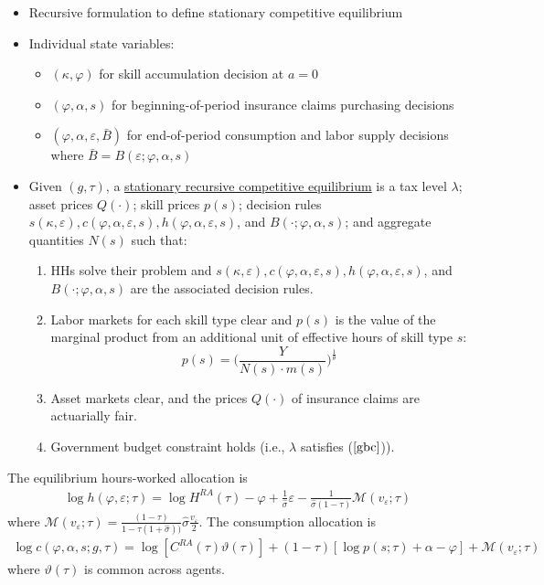 \documentclass{article}
\newcommand{\M}{\mathcal{M}}
\begin{document}
\begin{itemize}
\item Recursive formulation to define stationary competitive equilibrium
\item Individual state variables:
\begin{itemize}
\item $(\kappa, \varphi)$ for skill accumulation decision at $a = 0$
\item $(\varphi, \alpha, s)$ for beginning-of-period insurance claims purchasing decisions
\item $(\varphi, \alpha, \varepsilon, \bar B)$ for end-of-period consumption and labor supply decisions where $\bar B = B(\varepsilon; \varphi, \alpha, s)$
\end{itemize}
\item Given $(g, \tau)$, a \underline{stationary recursive competitive equilibrium} is a tax level $\lambda$; asset prices $Q(\cdot)$; skill prices $p(s)$; decision rules $s(\kappa, \varepsilon), c(\varphi, \alpha, \varepsilon, s), h(\varphi, \alpha, \varepsilon, s)$, and $B(\cdot; \varphi, \alpha, s)$; and aggregate quantities $N(s)$ such that:
\begin{enumerate}
\item HHs solve their problem and $s(\kappa, \varepsilon), c(\varphi, \alpha, \varepsilon, s), h(\varphi, \alpha, \varepsilon, s)$, and $B(\cdot; \varphi, \alpha, s)$ are the associated decision rules.
\item Labor markets for each skill type clear and $p(s)$ is the value of the marginal product from an additional unit of effective hours of skill type $s$:
$$
p(s) = \Bigg( \frac{Y}{N(s)\cdot m(s)} \Bigg)^{\frac{1}{\theta}}
$$
\item Asset markets clear, and the prices $Q(\cdot)$ of insurance claims are actuarially fair.
\item Government budget constraint holds (i.e., $\lambda$ satisfies ($\ref{gbc}$)).
\end{enumerate}
\end{itemize}



{
\proposition The equilibrium hours-worked allocation is
\begin{align}
\log h(\varphi, \varepsilon; \tau) = \log H^{RA}(\tau) - \varphi + \frac{1}{\hat{\sigma}} \varepsilon - \frac{1}{\hat \sigma (1- \tau)} \M (v_\varepsilon; \tau)
\end{align}
where $\M ( v_\varepsilon; \tau) = \frac{(1-\tau)}{1 - \tau(1+\hat \sigma))}{\hat \sigma} \frac{v_\varepsilon}{2}$. The consumption allocation is 
\begin{align}
\log c(\varphi, \alpha, s; g, \tau) = \log [C^{RA}(\tau)\vartheta(\tau)] + (1 - \tau) [\log p(s; \tau) + \alpha - \varphi] + \M (v_\varepsilon; \tau)
\end{align}
where $\vartheta(\tau)$ is common across agents.
}
\end{document}
